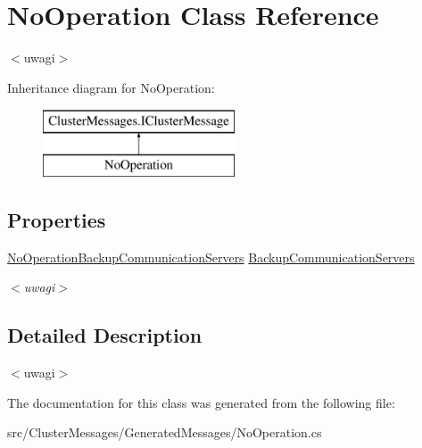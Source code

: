 \hypertarget{class_no_operation}{}\section{No\+Operation Class Reference}
\label{class_no_operation}


$<$uwagi$>$  


Inheritance diagram for No\+Operation\+:\begin{figure}[H]
\begin{center}
\leavevmode
\includegraphics[height=2.000000cm]{class_no_operation}
\end{center}
\end{figure}
\subsection*{Properties}
\begin{DoxyCompactItemize}
\item 
\hypertarget{class_no_operation_a34965a6f307880ac94de6dd23f2ab1b3}{}\hyperlink{class_no_operation_backup_communication_servers}{No\+Operation\+Backup\+Communication\+Servers} \hyperlink{class_no_operation_a34965a6f307880ac94de6dd23f2ab1b3}{Backup\+Communication\+Servers}\label{class_no_operation_a34965a6f307880ac94de6dd23f2ab1b3}

\begin{DoxyCompactList}\small\item\em $<$uwagi$>$ \end{DoxyCompactList}\end{DoxyCompactItemize}


\subsection{Detailed Description}
$<$uwagi$>$ 

The documentation for this class was generated from the following file\+:\begin{DoxyCompactItemize}
\item 
src/\+Cluster\+Messages/\+Generated\+Messages/No\+Operation.\+cs\end{DoxyCompactItemize}
